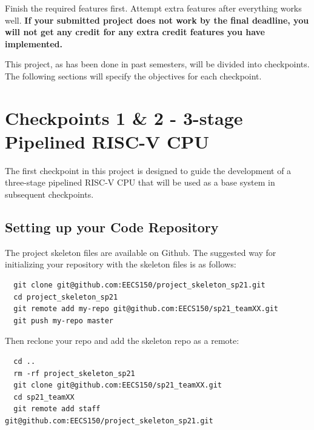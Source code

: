 \documentclass[11pt]{article}
\begin{document}
Finish the required features first.
Attempt extra features after everything works well.
\textbf{If your submitted project does not work by the final deadline, you will not get any credit for any extra credit features you have implemented.}

This project, as has been done in past semesters, will be divided into checkpoints. The following sections will specify the objectives for each checkpoint.

\section{Checkpoints 1 \& 2 - 3-stage Pipelined RISC-V CPU}
The first checkpoint in this project is designed to guide the development of a three-stage pipelined RISC-V CPU that will be used as a base system in subsequent checkpoints.



\subsection{Setting up your Code Repository}
The project skeleton files are available on Github.
The suggested way for initializing your repository with the skeleton files is as follows:

\begin{verbatim}
  git clone git@github.com:EECS150/project_skeleton_sp21.git
  cd project_skeleton_sp21
  git remote add my-repo git@github.com:EECS150/sp21_teamXX.git
  git push my-repo master
\end{verbatim}

Then reclone your repo and add the skeleton repo as a remote:
\begin{verbatim}
  cd ..
  rm -rf project_skeleton_sp21
  git clone git@github.com:EECS150/sp21_teamXX.git
  cd sp21_teamXX
  git remote add staff git@github.com:EECS150/project_skeleton_sp21.git
\end{verbatim}
\end{document}
